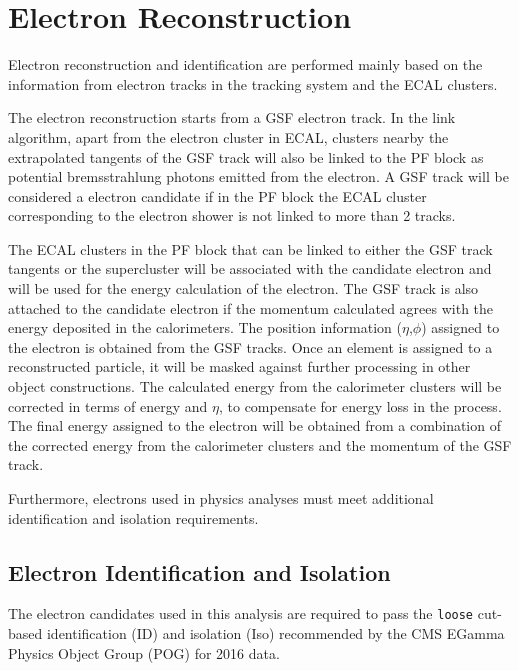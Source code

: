 \section{Electron Reconstruction}
Electron reconstruction and identification are performed mainly based on the information from electron tracks in the tracking system and the ECAL clusters. ~\cite{ob_electronconst2}

\vspace{0.3cm}
The electron reconstruction starts from a GSF electron track. In the link algorithm, apart from the electron cluster in ECAL, clusters nearby the extrapolated tangents of the GSF track will also be linked to the PF block as potential bremsstrahlung photons emitted from the electron. A GSF track will be considered a electron candidate if in the PF block the ECAL cluster corresponding to the electron shower is not linked to more than 2 tracks. 

\vspace{0.3cm}
The ECAL clusters in the PF block that can be linked to either the GSF track tangents or the supercluster will be associated with the candidate electron and will be used for the energy calculation of the electron. The GSF track is also attached to the candidate electron if the momentum calculated agrees with the energy deposited in the calorimeters. The position information ($\eta$,$\phi$) assigned to the electron is obtained from the GSF tracks. Once an element is assigned to a reconstructed particle, it will be masked against further processing in other object constructions. The calculated energy from the calorimeter clusters will be corrected in terms of energy and $\eta$, to compensate for energy loss in the process. The final energy assigned to the electron will be obtained from a combination of the corrected energy from the calorimeter clusters and the momentum of the GSF track. 

\vspace{0.3cm}
Furthermore, electrons used in physics analyses must meet additional identification and isolation requirements.

\subsection{Electron Identification and Isolation}\label{sec:ob_eidiso}
The electron candidates used in this analysis are required to pass the \texttt{loose} cut-based identification (ID) and isolation (Iso) recommended by the CMS EGamma Physics Object Group (POG) for 2016 data.


